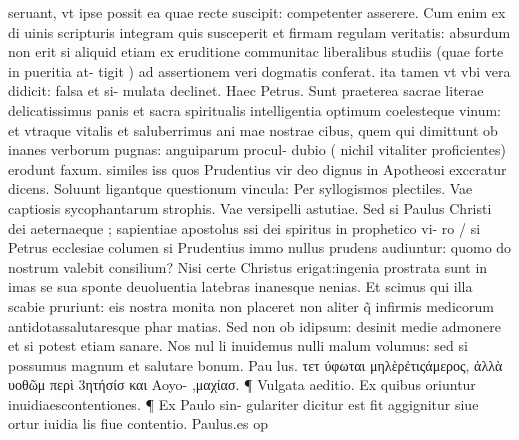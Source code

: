 \documentclass{article}
\begin{document}
\begin{pages}
seruant, vt ipse possit ea quae recte suscipit: competenter asserere. Cum enim ex di uinis scripturis integram quis susceperit et firmam regulam veritatis: absurdum non erit si aliquid etiam ex eruditione communitac liberalibus studiis (quae forte in pueritia at- tigit ) ad assertionem veri dogmatis conferat. ita tamen vt vbi vera didicit: falsa et si- mulata declinet. Haec Petrus. Sunt praeterea sacrae literae delicatissimus panis et sacra spiritualis intelligentia optimum coelesteque vinum: et vtraque vitalis et saluberrimus ani mae nostrae cibus, quem qui dimittunt ob inanes verborum pugnas: anguiparum procul- dubio ( nichil vitaliter proficientes) erodunt faxum. similes iss quos Prudentius vir deo dignus in Apotheosi exccratur dicens. Soluunt ligantque questionum vincula: Per syllogismos plectiles. Vae captiosis sycophantarum strophis. Vae versipelli astutiae.  \pend\pstart Sed si Paulus Christi dei aeternaeque ; sapientiae apostolus ssi dei spiritus in prophetico vi- ro / si Petrus ecclesiae columen si Prudentius immo nullus prudens audiuntur: quomo do nostrum valebit consilium? Nisi certe Christus erigat:ingenia prostrata sunt in imas se sua sponte deuoluentia latebras inanesque nenias. Et scimus qui illa scabie pruriunt: eis nostra monita non placeret non aliter q̃ infirmis medicorum antidotassalutaresque phar matias. Sed non ob idipsum: desinit medie admonere et si potest etiam sanare. Nos nul li inuidemus nulli malum volumus: sed si possumus magnum et salutare bonum. Pau lus. τετ ύφωται μηλὲρἐτιςάμερος, ἀλλὰ υοθῶμ περὶ 3ητήσίσ και Aoyo- ,μαχίασ. ¶ Vulgata aeditio. Ex quibus oriuntur inuidiaescontentiones. ¶ Ex Paulo sin- gulariter dicitur est fit aggignitur siue ortur iuidia lis fiue contentio. Paulus.es op  \pend

\end{pages}
\end{document}
